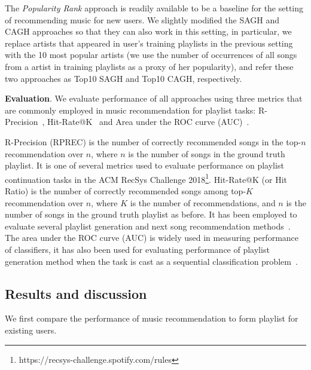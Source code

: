 The {\it Popularity Rank} approach is readily available to be a baseline for the setting of recommending music for new users.
%
We slightly modified the SAGH and CAGH approaches so that they can also work in this setting,
in particular, we replace artists that appeared in user's training playlists in the previous setting with the 10 most popular artists
(we use the number of occurrences of all songs from a artist in training playlists as a proxy of her popularity),
and refer these two approaches as Top10 SAGH and Top10 CAGH, respectively.



{\bf Evaluation}.
We evaluate performance of all approaches using three metrics that are commonly employed in music recommendation for playlist tasks:
R-Precision~\cite{manning2008introIR}, Hit-Rate@K~\cite{hariri2012context} and Area under the ROC curve (AUC)~\cite{manning2008introIR}.

R-Precision (RPREC) is the number of correctly recommended songs in the top-$n$ recommendation over $n$,
where $n$ is the number of songs in the ground truth playlist.
It is one of several metrics used to evaluate performance on playlist continuation tasks
in the ACM RecSys Challenge 2018\footnote{https://recsys-challenge.spotify.com/rules}.
%
Hit-Rate@K (or Hit Ratio) is the number of correctly recommended songs among top-$K$ recommendation over $n$,
where $K$ is the number of recommendations, and $n$ is the number of songs in the ground truth playlist as before.
It has been employed to evaluate several playlist generation and next song recommendation
methods~\cite{hariri2012context,bonnin2013evaluating,bonnin2015automated,jannach2015beyond}.
%
The area under the ROC curve (AUC) is widely used in measuring performance of classifiers,
it has also been used for evaluating performance of playlist generation method when the task
is cast as a sequential classification problem~\cite{ben2017groove}.


\subsection{Results and discussion}
We first compare the performance of music recommendation to form playlist for existing users.

